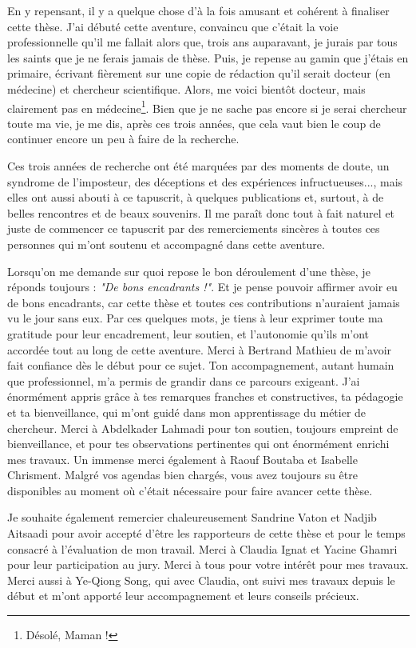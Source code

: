 En y repensant, il y a quelque chose d'à la fois amusant et cohérent à finaliser cette thèse. J'ai débuté cette aventure, convaincu que c'était la voie professionnelle qu'il me fallait alors que, trois ans auparavant, je jurais par tous les saints que je ne ferais jamais de thèse. Puis, je repense au gamin que j'étais en primaire, écrivant fièrement sur une copie de rédaction qu'il serait docteur (en médecine) et chercheur scientifique. Alors, me voici bientôt docteur, mais clairement pas en médecine\footnote{Désolé, Maman !}. Bien que je ne sache pas encore si je serai chercheur toute ma vie, je me dis, après ces trois années, que cela vaut bien le coup de continuer encore un peu à faire de la recherche.

Ces trois années de recherche ont été marquées par des moments de doute, un syndrome de l'imposteur, des déceptions et des expériences infructueuses..., mais elles ont aussi abouti à ce tapuscrit, à quelques publications et, surtout, à de belles rencontres et de beaux souvenirs. Il me paraît donc tout à fait naturel et juste de commencer ce tapuscrit par des remerciements sincères à toutes ces personnes qui m'ont soutenu et accompagné dans cette aventure.

Lorsqu'on me demande sur quoi repose le bon déroulement d'une thèse, je réponds toujours : \textit{"De bons encadrants !"}. Et je pense pouvoir affirmer avoir eu de bons encadrants, car cette thèse et toutes ces contributions n'auraient jamais vu le jour sans eux. Par ces quelques mots, je tiens à leur exprimer toute ma gratitude pour leur encadrement, leur soutien, et l'autonomie qu'ils m'ont accordée tout au long de cette aventure.  
Merci à Bertrand Mathieu de m'avoir fait confiance dès le début pour ce sujet. Ton accompagnement, autant humain que professionnel, m'a permis de grandir dans ce parcours exigeant. J'ai énormément appris grâce à tes remarques franches et constructives, ta pédagogie et ta bienveillance, qui m'ont guidé dans mon apprentissage du métier de chercheur. Merci à Abdelkader Lahmadi pour ton soutien, toujours empreint de bienveillance, et pour tes observations pertinentes qui ont énormément enrichi mes travaux. Un immense merci également à Raouf Boutaba et Isabelle Chrisment. Malgré vos agendas bien chargés, vous avez toujours su être disponibles au moment où c'était nécessaire pour faire avancer cette thèse.

Je souhaite également remercier chaleureusement Sandrine Vaton et Nadjib Aitsaadi pour avoir accepté d’être les rapporteurs de cette thèse et pour le temps consacré à l’évaluation de mon travail. Merci à Claudia Ignat et Yacine Ghamri pour leur participation au jury. Merci à tous pour votre intérêt pour mes travaux. Merci aussi à Ye-Qiong Song, qui avec Claudia, ont suivi mes travaux depuis le début et m’ont apporté leur accompagnement et leurs conseils précieux.

